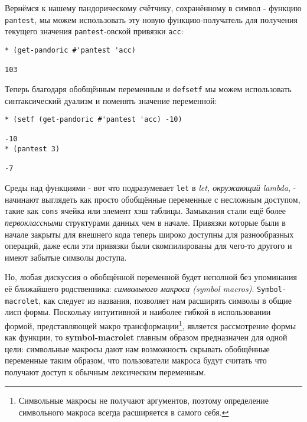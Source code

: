 Вернёмся к нашему пандорическому счётчику, сохранённому в символ - функцию \verb"pantest", мы можем использовать эту новую функцию-получатель для получения текущего значения \verb"pantest"-овской привязки \verb"acc":

\begin{verbatim}
* (get-pandoric #'pantest 'acc)

103
\end{verbatim}

Теперь благодаря обобщённым переменным и \verb"defsetf" мы можем использовать синтаксический дуализм и поменять значение переменной:

\begin{verbatim}
* (setf (get-pandoric #'pantest 'acc) -10)

-10
* (pantest 3)

-7
\end{verbatim}

Среды над функциями - вот что подразумевает \verb"let" в \emph{let, окружающий lambda}, - начинают выглядеть как просто обобщённые переменные с несложным доступом, такие как \verb"cons" ячейка или элемент хэш таблицы. Замыкания стали ещё более \emph{первоклассными} структурами данных чем в начале. Привязки которые были в начале закрыты для внешнего кода теперь широко доступны для разнообразных операций, даже если эти привязки были скомпилированы для чего-то другого и имеют забытые символы доступа.

Но, любая дискуссия о обобщённой переменной будет неполной без упоминания её ближайшего родственника: \emph{символьного макроса (symbol macros)}. \verb"Symbol-macrolet", как следует из названия, позволяет нам расширять символы в общие лисп формы. Поскольку интуитивной и наиболее гибкой в использовании формой, представляющей макро трансформации\footnote{Символьные макросы не получают аргументов, поэтому определение символьного макроса всегда расширяется в самого себя.}, является рассмотрение формы как функции, то \textbf{sym\-bol\--\-mac\-ro\-let} главным образом предназначен для одной цели: символьные макросы дают нам возможность скрывать обобщённые переменные таким образом, что пользователи макроса будут считать что получают доступ к обычным лексическим переменным.



